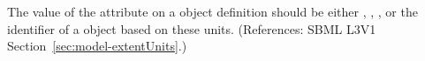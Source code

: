 The value of the  attribute on a \Model object
definition should be either , , ,
 or the identifier of a \UnitDefinition object based on
these units.  (References: SBML L3V1 Section~\ref{sec:model-extentUnits}.)
